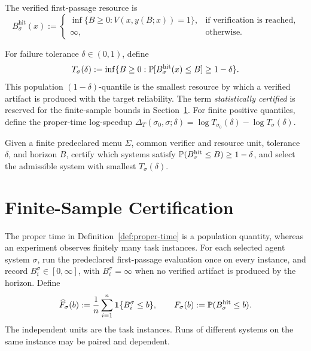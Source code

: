 \begin{definition}
\label{def:first-passage}
The verified first-passage resource is
\begin{equation}
B_\sigma^{\mathrm{hit}}(x):=
\begin{cases}
\inf\{B\ge0:V(x,y(B;x))=1\},&\text{if verification is reached},\\
\infty,&\text{otherwise}.
\end{cases}
\label{eq:first-passage}
\end{equation}
\end{definition}

\begin{definition}
\label{def:proper-time}
For failure tolerance \(\delta\in(0,1)\), define
\begin{equation}
T_\sigma(\delta):=\inf\{B\ge0:\mathbb{P}[B_\sigma^{\mathrm{hit}}(x)\le B]\ge1-\delta\}.
\label{eq:proper-time-system}
\end{equation}
This population \((1-\delta)\)-quantile is the smallest resource by which a
verified artifact is produced with the target reliability.
The term \emph{statistically certified} is reserved for the finite-sample bounds
in Section~\ref{sec:finite-sample}.  For finite positive quantiles, define the
proper-time log-speedup
\(\Delta_T(\sigma_0,\sigma;\delta)=
\log T_{\sigma_0}(\delta)-\log T_\sigma(\delta)\).
\end{definition}

\begin{problem}
\label{prob:model-selection}
Given a finite predeclared menu \(\Sigma\), common verifier and resource
unit, tolerance \(\delta\), and horizon \(B\), certify which systems satisfy
\(\mathbb{P}(B_\sigma^{\mathrm{hit}}\le B)\ge1-\delta\), and select the admissible
system with smallest \(T_\sigma(\delta)\).
\end{problem}

\section{Finite-Sample Certification}
\label{sec:finite-sample}

The proper time in Definition~\ref{def:proper-time} is a population quantity,
whereas an experiment observes finitely many task instances.  For each selected agent system \(\sigma\), run the predeclared first-passage evaluation once on every instance, and record
\(B_i^\sigma\in[0,\infty]\), with \(B_i^\sigma=\infty\)
when no verified artifact is produced by the horizon.  Define
\begin{equation}
\widehat F_\sigma(b):=\frac{1}{n}\sum_{i=1}^{n}
\mathbf 1\{B_i^\sigma\le b\},
\qquad
F_\sigma(b):=\mathbb{P}(B_\sigma^{\mathrm{hit}}\le b).
\label{eq:empirical-cdf}
\end{equation}
The independent units are the task instances.  Runs of different systems on
the same instance may be paired and dependent.

